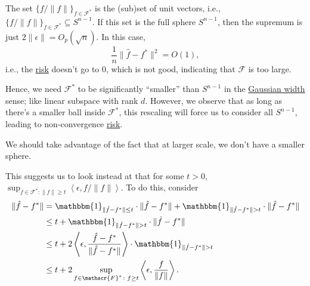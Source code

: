 \begin{note}
	The set \(\{ f / \lVert f \rVert \} _{f\in \mathscr{F} ^{\ast} }\) is the (sub)set of unit vectors, i.e., \(\{ f / \lVert f \rVert \} _{f\in \mathscr{F} ^{\ast} } \subseteq S^{n-1}\). If this set is the full sphere \(S^{n-1}\), then the supremum is just \(2 \lVert \epsilon \rVert = O_p (\sqrt{n} )\). In this case,
	\[
		\frac{1}{n} \lVert \hat{f} - f^{\ast}  \rVert ^2 = O(1),
	\]
	i.e., the \hyperref[not:risk]{risk} doesn't go to \(0\), which is not good, indicating that \(\mathscr{F} \) is too large.
\end{note}

Hence, we need \(\mathscr{F} ^{\ast} \) to be significantly ``smaller'' than \(S^{n-1}\) in the \hyperref[def:Gaussian-width]{Gaussian width} sense; like linear subspace with rank \(d\). However, we observe that as long as there's a smaller ball inside \(\mathscr{F} ^{\ast} \), this rescaling will force us to consider all \(S^{n-1}\), leading to non-convergence \hyperref[not:risk]{risk}.

\begin{center}
\end{center}

\begin{intuition}
	We should take advantage of the fact that at larger scale, we don't have a smaller sphere.
\end{intuition}

This suggests us to look instead at that for some \(t > 0\), \(\sup _{f\in \mathscr{F} ^{\ast} \colon \lVert f \rVert \geq t} \left\langle \epsilon , f / \lVert f \rVert \right\rangle \). To do this, consider
\[
	\begin{split}
		\lVert \hat{f} - f^{\ast} \rVert
		&= \mathbbm{1}_{\lVert \hat{f} - f^{\ast} \rVert \leq t} \cdot \lVert \hat{f} - f^{\ast} \rVert + \mathbbm{1}_{\lVert \hat{f} - f^{\ast} \rVert > t} \cdot \lVert \hat{f} - f^{\ast} \rVert \\
		&\leq t + \mathbbm{1}_{\lVert \hat{f} - f^{\ast} \rVert > t} \cdot \lVert \hat{f} - f^{\ast} \rVert \\
		&\leq t + 2 \left\langle \epsilon , \frac{\hat{f} - f^{\ast} }{\lVert \hat{f} - f^{\ast} \rVert } \right\rangle \cdot \mathbbm{1}_{\lVert \hat{f} - f^{\ast} \rVert > t} \\
		&\leq t + 2 \sup _{\substack{f \in\mathscr{F} ^{\ast} \colon f \geq t}} \left\langle \epsilon , \frac{f}{\lVert f \rVert } \right\rangle .
	\end{split}
\]


